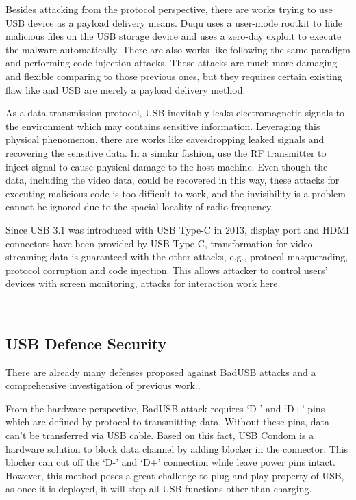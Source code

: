 Besides attacking from the protocol perspective, there are works trying to use USB device as a payload delivery means. Duqu\cite{duqu} uses a user-mode rootkit to hide malicious files on the USB storage device and uses a zero-day exploit\cite{zero-day} to execute the malware automatically. There are also works like \cite{brain, stuxnet, conficker,flame} following the same paradigm and performing code-injection attacks. These attacks are much more damaging and flexible comparing to those previous ones, but they requires certain existing flaw like \cite{zero-day} and USB are merely a payload delivery method.

As a data transmission protocol, USB inevitably leaks electromagnetic signals to the environment which may contains sensitive information. Leveraging this physical phenomenon, there are works like \cite{smartphone, poweremi,revealing,su2017usb, usbgpslocator, bates2014leveraging, badusbhub, usbfinger, side, usbdriver} eavesdropping leaked signals and recovering the sensitive data. In a similar fashion, \cite{usbkiller, cable, usbee, turnip} use the RF transmitter to inject signal to cause physical damage to the host machine. Even though the data, including the video data, could be recovered in this way, these attacks for executing malicious code is too difficult to work, and the invisibility is a problem cannot be ignored due to the spacial locality of radio frequency. 

Since USB 3.1 was introduced with USB Type-C in 2013, display port and HDMI connectors have been provided by USB Type-C, transformation for video streaming data is guaranteed with the other attacks, e.g., protocol masquerading,  protocol corruption and code injection. This allows attacker to control users' devices with screen monitoring, attacks for interaction work here.




\\


\subsection{USB Defence Security}
\label{subsec:usb_defence}
There are already many defenses proposed against BadUSB attacks and a comprehensive investigation of previous work.\cite{sok}.

From the hardware perspective, BadUSB attack requires `D-' and `D+' pins which are defined by protocol to transmitting data.
Without these pins, data can't be transferred via USB cable. Based on this fact, USB Condom \cite{Condom} is a hardware solution to block data channel by adding blocker in the connector. This blocker can cut off the `D-' and `D+' connection while leave power pins intact.
However, this method poses a great challenge to plug-and-play property of USB, as once it is deployed, it will stop all USB functions other than charging. 

